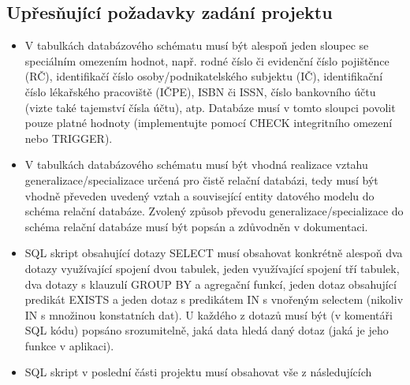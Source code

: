 \documentclass[11pt, a4paper, titlepage]{article}
\begin{document}

\subsection*{Upřesňující požadavky zadání projektu}

\begin{itemize}
	\item V tabulkách databázového schématu musí být alespoň jeden sloupec se speciálním omezením hodnot, např. rodné číslo či evidenční číslo pojištěnce (RČ), identifikačí číslo osoby/podnikatelského subjektu (IČ), identifikační číslo lékařského pracoviště (IČPE), ISBN či ISSN, číslo bankovního účtu (vizte také tajemství čísla účtu), atp. Databáze musí v tomto sloupci povolit pouze platné hodnoty (implementujte pomocí CHECK integritního omezení nebo TRIGGER).

	\item V tabulkách databázového schématu musí být vhodná realizace vztahu generalizace/specializace určená pro čistě relační databázi, tedy musí být vhodně převeden uvedený vztah a související entity datového modelu do schéma relační databáze. Zvolený způsob převodu generalizace/specializace do schéma relační databáze musí být popsán a zdůvodněn v dokumentaci.

	\item SQL skript obsahující dotazy SELECT musí obsahovat konkrétně alespoň dva dotazy využívající spojení dvou tabulek, jeden využívající spojení tří tabulek, dva dotazy s klauzulí GROUP BY a agregační funkcí, jeden dotaz obsahující predikát EXISTS a jeden dotaz s predikátem IN s vnořeným selectem (nikoliv IN s množinou konstatních dat). U každého z dotazů musí být (v komentáři SQL kódu) popsáno srozumitelně, jaká data hledá daný dotaz (jaká je jeho funkce v aplikaci).

	\item SQL skript v poslední části projektu musí obsahovat vše z následujících
\end{itemize}
\end{document}
